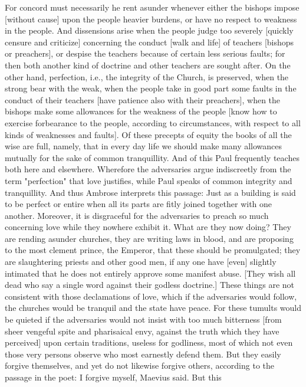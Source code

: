 For concord must necessarily he rent asunder whenever either the
bishops impose [without cause] upon the people heavier burdens, or
have no respect to weakness in the people.  And dissensions arise
when the people judge too severely [quickly censure and criticize]
concerning the conduct [walk and life] of teachers [bishops or
preachers], or despise the teachers because of certain less serious
faults; for then both another kind of doctrine and other teachers are
sought after.  On the other hand, perfection, i.e., the integrity of
the Church, is preserved, when the strong bear with the weak, when
the people take in good part some faults in the conduct of their
teachers [have patience also with their preachers], when the bishops
make some allowances for the weakness of the people [know how to
exercise forbearance to the people, according to circumstances, with
respect to all kinds of weaknesses and faults].  Of these precepts of
equity the books of all the wise are full, namely, that in every day
life we should make many allowances mutually for the sake of common
tranquillity.  And of this Paul frequently teaches both here and
elsewhere.  Wherefore the adversaries argue indiscreetly from the
term "perfection" that love justifies, while Paul speaks of common
integrity and tranquillity.  And thus Ambrose interprets this passage:
Just as a building is said to be perfect or entire when all its
parts are fitly joined together with one another.  Moreover, it is
disgraceful for the adversaries to preach so much concerning love
while they nowhere exhibit it.  What are they now doing?  They are
rending asunder churches, they are writing laws in blood, and are
proposing to the most clement prince, the Emperor, that these should
be promulgated; they are slaughtering priests and other good men, if
any one have [even] slightly intimated that he does not entirely
approve some manifest abuse.  [They wish all dead who say a single
word against their godless doctrine.] These things are not consistent
with those declamations of love, which if the adversaries would
follow, the churches would be tranquil and the state have peace.  For
these tumults would be quieted if the adversaries would not insist
with too much bitterness [from sheer vengeful spite and pharisaical
envy, against the truth which they have perceived] upon certain
traditions, useless for godliness, most of which not even those very
persons observe who most earnestly defend them.  But they easily
forgive themselves, and yet do not likewise forgive others, according
to the passage in the poet: I forgive myself, Maevius said.  But this
